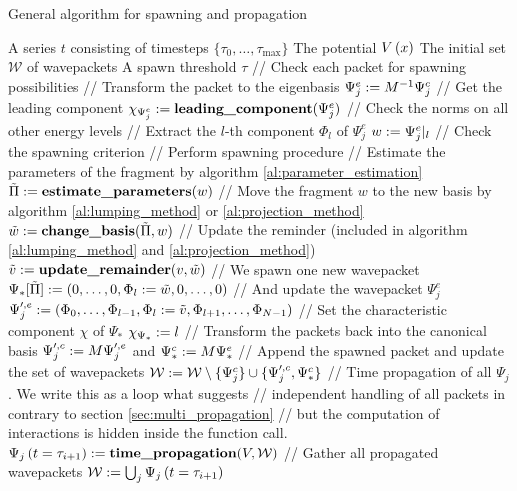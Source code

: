 \begin{chapter}{General algorithm for spawning and propagation}
\begin{algorithm}
\caption{Spawning propagation method (general non-adiabatic case)}
\label{al:spawning_propagation_na_general}
\begin{algorithmic}
  \REQUIRE A series $t$ consisting of timesteps $\{\tau_0, \ldots, \tau_{\text{max}}\}$
  \REQUIRE The potential $V\left( x \right)$
  \REQUIRE The initial set $\mathcal{W}$ of wavepackets
  \REQUIRE A spawn threshold $\tau$
    \STATE // Check each packet for spawning possibilities
      \STATE // Transform the packet to the eigenbasis
      \STATE $\Psi_j^e := M^{-1} \Psi_j^c$
      \STATE // Get the leading component
      \STATE $\chi_{\Psi_j^e} := \textbf{leading\_component}(\Psi_j^e)$
      \STATE // Check the norms on all other energy levels
        \STATE // Extract the $l$-th component $\Phi_l$ of $\Psi_j^e$
        \STATE $w := \Psi_j^e|_l$
        \STATE // Check the spawning criterion
          \STATE // Perform spawning procedure
          \STATE // Estimate the parameters of the fragment by algorithm \ref{al:parameter_estimation}
          \STATE $\tilde{\Pi} := \textbf{estimate\_parameters}(w)$
          \STATE // Move the fragment $w$ to the new basis by algorithm \ref{al:lumping_method} or \ref{al:projection_method}
          \STATE $\tilde{w} := \textbf{change\_basis}(\tilde{\Pi}, w)$
          \STATE // Update the reminder (included in algorithm \ref{al:lumping_method} and \ref{al:projection_method})
          \STATE $\tilde{v} := \textbf{update\_remainder}(v, \tilde{w})$
          \STATE // We spawn one new wavepacket
          \STATE $\Psi_*[\tilde{\Pi}] := \left(0, \ldots, 0, \Phi_l:=\tilde{w}, 0, \ldots, 0\right)$
          \STATE // And update the wavepacket $\Psi_j^e$
          \STATE $\Psi_j^{\prime,e}  := \left(\Phi_0, \ldots, \Phi_{l-1}, \Phi_l:=\tilde{v}, \Phi_{l+1}, \ldots, \Phi_{N-1}\right)$
          \STATE // Set the characteristic component $\chi$ of $\Psi_*$
          \STATE $\chi_{\Psi_*} := l$
          \STATE // Transform the packets back into the canonical basis
          \STATE $\Psi^{\prime,c}_j := M \Psi^{\prime,e}_j$ and $\Psi^c_* := M \Psi^e_*$
          \STATE // Append the spawned packet and update the set of wavepackets
          \STATE $\mathcal{W} := \mathcal{W} \setminus \{\Psi^{c}_j\} \cup \{\Psi^{\prime,c}_j,\Psi_*^c\}$
        \ENDIF
      \ENDFOR
    \ENDFOR
    \STATE // Time propagation of all $\Psi_j$. We write this as a loop what suggests
    \STATE // independent handling of all packets in contrary to section \ref{sec:multi_propagation}
    \STATE // but the computation of interactions is hidden inside the function call.
       \STATE $\Psi_j\left( t=\tau_{i+1} \right) := \textbf{time\_propagation}(V, \mathcal{W})$
    \ENDFOR
    \STATE // Gather all propagated wavepackets
    \STATE $\mathcal{W} := \bigcup_{j} \Psi_j\left( t=\tau_{i+1} \right)$
  \ENDFOR
\end{algorithmic}
\end{algorithm}

\end{chapter}
